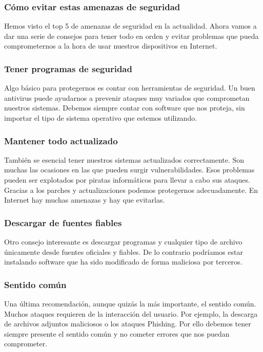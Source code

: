 \documentclass[12pt]{article}
\begin{document}
  \subsubsection*{Cómo evitar estas amenazas de seguridad}
  Hemos visto el top 5 de amenazas de seguridad en la actualidad. Ahora vamos a dar una serie de consejos para tener todo en orden y evitar problemas que pueda comprometernos a la hora de usar nuestros dispositivos en Internet.

  \subsubsection*{Tener programas de seguridad}
  Algo básico para protegernos es contar con herramientas de seguridad. Un buen antivirus puede ayudarnos a prevenir ataques muy variados que comprometan nuestros sistemas. Debemos siempre contar con software que nos proteja, sin importar el tipo de sistema operativo que estemos utilizando.

  \subsubsection*{Mantener todo actualizado}
  También se esencial tener nuestros sistemas actualizados correctamente. Son muchas las ocasiones en las que pueden surgir vulnerabilidades. Esos problemas pueden ser explotados por piratas informáticos para llevar a cabo sus ataques. Gracias a los parches y actualizaciones podemos protegernos adecuadamente. En Internet hay muchas amenazas y hay que evitarlas.

  \subsubsection*{Descargar de fuentes fiables}
  Otro consejo interesante es descargar programas y cualquier tipo de archivo únicamente desde fuentes oficiales y fiables. De lo contrario podríamos estar instalando software que ha sido modificado de forma maliciosa por terceros.

  \subsubsection*{Sentido común}
  Una última recomendación, aunque quizás la más importante, el sentido común. Muchos ataques requieren de la interacción del usuario. Por ejemplo, la descarga de archivos adjuntos maliciosos o los ataques Phishing. Por ello debemos tener siempre presente el sentido común y no cometer errores que nos puedan comprometer.
\end{document}
